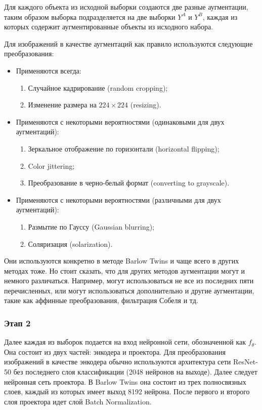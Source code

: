 Для каждого объекта из исходной выборки создаются две разные аугментации, таким образом выборка подразделяется на две выборки $Y^A$ и $Y^B$, каждая из которых содержит аугментированные объекты из исходного набора.

Для изображений в качестве аугментаций как правило используются следующие преобразования:
\begin{itemize}
    \item Применяются всегда:
        \begin{enumerate} 
            \item Случайное кадрирование (random cropping);
            \item Изменение размера на $224\times224$ (resizing).
        \end{enumerate}
    \item Применяются с некоторыми вероятностями (одинаковыми для двух аугментаций):
        \begin{enumerate} 
            \item Зеркальное отображение по горизонтали (horizontal flipping);
            \item Color jittering;
            \item Преобразование в черно-белый формат (converting to grayscale).
        \end{enumerate}
    \item Применяются с некоторыми вероятностями (различными для  двух аугментаций):
        \begin{enumerate} 
            \item Размытие по Гауссу (Gaussian blurring);
            \item Соляризация (solarization).
        \end{enumerate}
\end{itemize}

Они используются конкретно в методе Barlow Twins и чаще всего в других методах тоже. Но стоит сказать, что для других методов аугментации могут и немного различаться. Например, могут использоваться не все из последних пяти перечисленных, или могут использоваться дополнительно и другие аугментации, такие как аффинные преобразования, фильтрация Собеля и тд.

\subsubsection{Этап 2}

Далее каждая из выборок подается на вход нейронной сети, обозначенной как $f_\theta$. Она состоит из двух частей: энкодера и проектора. Для преобразования изображений в качестве энкодера обычно используются архитектура сети ResNet-50 \cite{ResNet} без последнего слоя классификации (2048 нейронов на выходе). Далее следует нейронная сеть проектора. В Barlow Twins она состоит из трех полносвязных слоев, каждый из которых имеет выход 8192 нейрона. После первого и второго слоя проектора идет слой Batch Normalization. 

